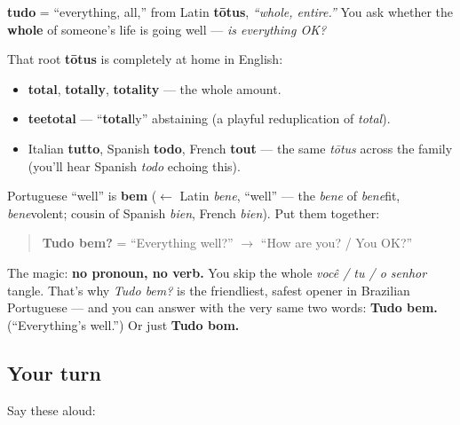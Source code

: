 \begin{cousinweb}
\textbf{tudo} = \textquotedblleft{}everything, all,\textquotedblright{} from Latin \textbf{tōtus}, \emph{\textquotedblleft{}whole, entire.\textquotedblright{}} You ask whether the \textbf{whole} of someone's life is going well — \emph{is everything OK?}

That root \textbf{tōtus} is completely at home in English:

\begin{itemize}
\raggedright
  \item \textbf{total}, \textbf{totally}, \textbf{totality} — the whole amount.
  \item \textbf{teetotal} — \textquotedblleft{}\textbf{total}ly\textquotedblright{} abstaining (a playful reduplication of \emph{total}).
  \item Italian \textbf{tutto}, Spanish \textbf{todo}, French \textbf{tout} — the same \emph{tōtus} across the family (you'll hear Spanish \emph{todo} echoing this).
\end{itemize}
\end{cousinweb}

\begin{grammarlens}[title={Grammar Lens: pairing it with \textquotedblleft{}well\textquotedblright{}}]
Portuguese \textquotedblleft{}well\textquotedblright{} is \textbf{bem} ($\leftarrow$ Latin \emph{bene}, \textquotedblleft{}well\textquotedblright{} — the \emph{bene} of \emph{bene}fit, \emph{bene}volent; cousin of Spanish \emph{bien}, French \emph{bien}). Put them together:

\begin{quote}
\textbf{Tudo bem?} = \textquotedblleft{}Everything well?\textquotedblright{} $\to$ \textquotedblleft{}How are you? / You OK?\textquotedblright{}
\end{quote}

The magic: \textbf{no pronoun, no verb.} You skip the whole \emph{você / tu / o senhor} tangle. That's why \emph{Tudo bem?} is the friendliest, safest opener in Brazilian Portuguese — and you can answer with the very same two words: \textbf{Tudo bem.} (\textquotedblleft{}Everything's well.\textquotedblright{}) Or just \textbf{Tudo bom.}
\end{grammarlens}

\subsection*{Your turn}
Say these aloud:

